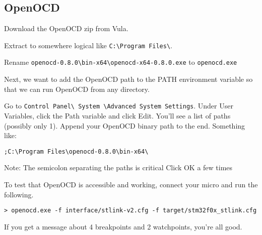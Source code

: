 \subsection{OpenOCD}
Download the OpenOCD zip from Vula. 

Extract to somewhere logical like \verb+C:\Program Files\+. 

Rename \verb+openocd-0.8.0\bin-x64\openocd-x64-0.8.0.exe+ to \verb+openocd.exe+

Next, we want to add the OpenOCD path to the PATH environment variable so that we can run OpenOCD from any directory.

Go to \verb+Control Panel\ System \Advanced System Settings+. Under User Variables, click the Path variable and click Edit. You’ll see a list of paths (possibly only 1). Append your OpenOCD binary path to the end.
Something like:
\begin{verbatim}
;C:\Program Files\openocd-0.8.0\bin-x64\
\end{verbatim}
Note: The semicolon separating the paths is critical Click OK a few times 

To test that OpenOCD is accessible and working, connect your micro and run the following.
\begin{lstlisting}[style=BashStyle]
> openocd.exe -f interface/stlink-v2.cfg -f target/stm32f0x_stlink.cfg
\end{lstlisting}
If you get a message about 4 breakpoints and 2 watchpoints, you're all good.

